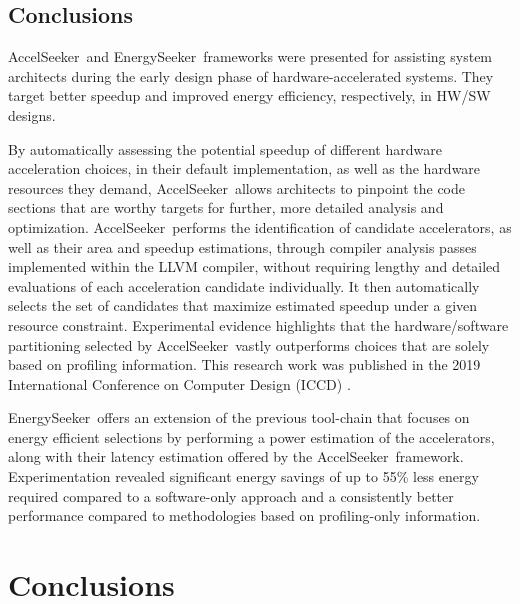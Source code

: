 \documentclass[]{usiinfthesis}
\newcommand{\aseeker}{{AccelSeeker}}
\newcommand{\eseeker}{{EnergySeeker}}
\begin{document}
\section{Conclusions}
\label{sec:conclusions_as}

\aseeker\ and \eseeker\ frameworks were presented for assisting system architects during the early design phase of hardware-accelerated systems. They target better speedup and improved energy efficiency, respectively, in HW/SW designs.\par
By automatically assessing the potential speedup of different hardware acceleration choices, in their default implementation, as well as the hardware resources they demand, \aseeker\ allows architects to pinpoint the code sections that are worthy targets for further, more detailed analysis and optimization. \aseeker\ performs the identification of candidate accelerators, as well as their area and speedup estimations, through compiler analysis passes implemented within the LLVM compiler, without requiring lengthy and detailed evaluations of each acceleration candidate individually. It then automatically selects the set of candidates that maximize estimated speedup under a given resource constraint. Experimental evidence highlights that the hardware/software partitioning selected by \aseeker\ vastly outperforms choices that are solely based on profiling information. This research work was published in the 2019 International Conference on Computer Design (ICCD) \cite{ZacharopoulosNov19}.\par
%
%
\eseeker\ offers an extension of the previous tool-chain that focuses on energy efficient selections by performing a power estimation of the accelerators, along with their latency estimation offered by the \aseeker\ framework. Experimentation revealed significant energy savings of up to 55\% less energy required compared to a software-only approach and a consistently better performance compared to methodologies based on profiling-only information.




%
%
%
%
%
%
%
%
%
%



\chapter*{Conclusions}
\end{document}
